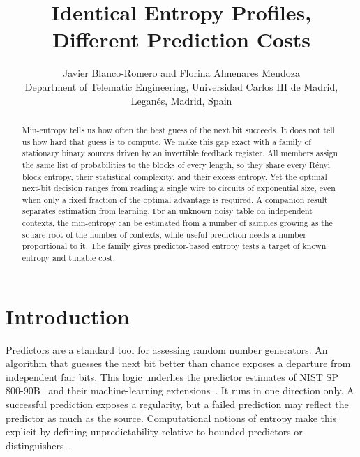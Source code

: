 \documentclass[11pt,a4paper]{article}
\title{Identical Entropy Profiles, Different Prediction Costs}
\author{Javier Blanco-Romero and Florina Almenares Mendoza\\\small Department of Telematic Engineering, Universidad Carlos III de Madrid,\\Legan\'es, Madrid, Spain}
\date{}
\begin{document}
\maketitle
\begin{abstract}
Min-entropy tells us how often the best guess of the next bit succeeds. It does not tell us how hard that guess is to compute. We make this gap exact with a family of stationary binary sources driven by an invertible feedback register. All members assign the same list of probabilities to the blocks of every length, so they share every R\'enyi block entropy, their statistical complexity, and their excess entropy. Yet the optimal next-bit decision ranges from reading a single wire to circuits of exponential size, even when only a fixed fraction of the optimal advantage is required. A companion result separates estimation from learning. For an unknown noisy table on independent contexts, the min-entropy can be estimated from a number of samples growing as the square root of the number of contexts, while useful prediction needs a number proportional to it. The family gives predictor-based entropy tests a target of known entropy and tunable cost.
\end{abstract}

\section{Introduction}

Predictors are a standard tool for assessing random number generators. An algorithm that guesses the next bit better than chance exposes a departure from independent fair bits. This logic underlies the predictor estimates of NIST SP 800-90B~\cite{kelsey2015predictive,sonmez2018recommendation} and their machine-learning extensions~\cite{blanco2025machine}. It runs in one direction only. A successful prediction exposes a regularity, but a failed prediction may reflect the predictor as much as the source. Computational notions of entropy make this explicit by defining unpredictability relative to bounded predictors or distinguishers~\cite{yao1982theory,barak2003computational,hsiao2007conditional}.
\end{document}
